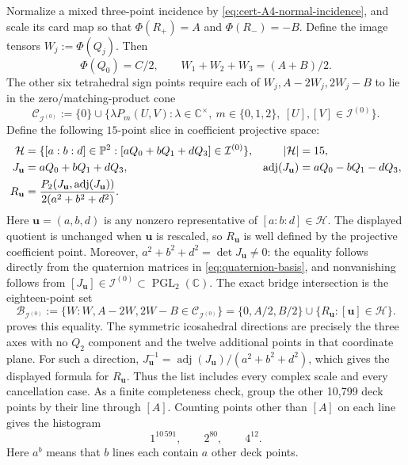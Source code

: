\documentclass[11pt,letterpaper,onecolumn]{article}
\theoremstyle{plain}
\theoremstyle{definition}
\theoremstyle{remark}
\newcommand{\IcoZero}{{\mathcal I^{(0)}}}
\newcommand{\PGL}{\operatorname{PGL}}
\begin{document}
Normalize a mixed three-point incidence by
\eqref{eq:cert-A4-normal-incidence}, and scale its card map so that
\(\Phi(R_+)=A\) and \(\Phi(R_-)=-B\).  Define the image tensors
\(W_j:=\Phi(Q_j)\).  Then
\hypertarget{eq:cert-A5-sum}{}
\begin{equation*}
 \Phi(Q_0)=C/2,
 \qquad
 W_1+W_2+W_3=(A+B)/2.
\end{equation*}
The other six tetrahedral sign points require each of
\(W_j,A-2W_j,2W_j-B\) to lie in the zero/matching-product cone
\[
 \mathscr C_{\IcoZero}:=
 \{0\}\cup
 \{\lambda P_m(U,V):\lambda\in\mathbb C^\times,\
      m\in\{0,1,2\},\ [U],[V]\in\IcoZero\}.
\]
Define the following \(15\)-point slice in coefficient projective space:
\begin{align*}
 \mathcal H&=
 \{[a:b:d]\in\mathbb P^2:
      [aQ_0+bQ_1+dQ_3]\in\IcoZero\},
 &|\mathcal H|&=15,\notag\\
 J_{\mathbf{u}}&=aQ_0+bQ_1+dQ_3,
 &\operatorname{adj}(J_{\mathbf{u}})&=aQ_0-bQ_1-dQ_3,\notag\\
  R_{\mathbf{u}}&=\frac{P_2(J_{\mathbf{u}},\operatorname{adj}(J_{\mathbf{u}}))}{2(a^2+b^2+d^2)}.
\end{align*}
Here \({\mathbf{u}}=(a,b,d)\) is any nonzero representative of
\([a:b:d]\in\mathcal H\).  The displayed quotient is unchanged when \({\mathbf{u}}\)
is rescaled, so \(R_{\mathbf{u}}\) is well defined by the projective coefficient
point.  Moreover,
\(a^2+b^2+d^2=\det J_{\mathbf{u}}\ne0\): the equality follows directly from the
quaternion matrices in \cref{eq:quaternion-basis}, and nonvanishing follows
from \([J_{\mathbf{u}}]\in\IcoZero\subset\PGL_2(\mathbb C)\).  
The exact bridge intersection is the eighteen-point set
\hypertarget{eq:cert-A5-bridge}{}
\begin{equation*}
 \mathcal B_{\IcoZero}:=\{W:W,A-2W,2W-B\in\mathscr C_{\IcoZero}\}
 =\{0,A/2,B/2\}\cup\{R_{\mathbf{u}}:[{\mathbf{u}}]\in\mathcal H\}.
\end{equation*}
 proves this equality.  The symmetric
icosahedral directions are precisely the three axes with no \(Q_2\)
component and the twelve additional points in that coordinate plane.
For such a direction,
\(J_{\mathbf{u}}^{-1}=\operatorname{adj}(J_{\mathbf{u}})/(a^2+b^2+d^2)\), which gives the displayed
formula for \(R_{\mathbf{u}}\).  Thus the list includes every complex scale and
every cancellation case.
As a finite completeness check, group the other 10,799 deck points by
their line through \([A]\). Counting points other than \([A]\) on each
line gives the histogram
\hypertarget{eq:cert-A5-line-buckets}{}
\begin{equation*}
 1^{10\,591},\qquad2^{80},\qquad4^{12}.
\end{equation*}
Here \(a^b\) means that \(b\) lines each contain \(a\) other deck points.
\end{document}
